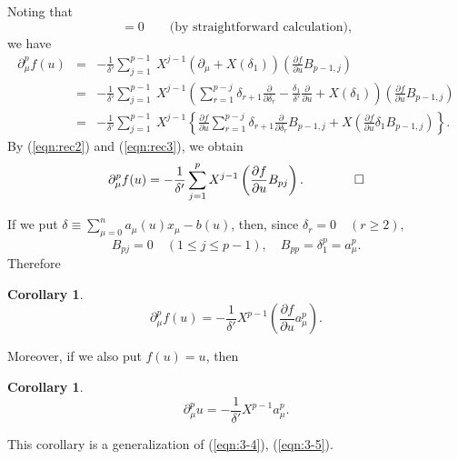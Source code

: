 \documentclass[makeidx,12pt,openany]{report}
\newtheorem{cor}[df]{Corollary}
\begin{document}
Noting that 
\begin{equation}
 [\partial_{\mu}+X(\delta_1), X]=0
 \qquad \mbox{(by straightforward calculation),}
\end{equation}
we have
\begin{eqnarray*}
 \partial_{\mu}^p f(u) 
  &=& -\frac{1}{\delta'} \sum_{j=1}^{p-1} \ 
       X^{j-1} (\partial_{\mu}+X(\delta_1)) 
        \left( \frac{\partial f}{\partial u}B_{p-1,j} \right) \\
  &=& -\frac{1}{\delta'} \sum_{j=1}^{p-1} \ X^{j-1} 
      \left(
       \sum_{r=1}^{p-j} \delta_{r+1} 
        \frac{\partial}{\partial \delta_r} 
       -\frac{\delta_1}{\delta'} \frac{\partial}{\partial u}
        +X(\delta_1) 
      \right) \left( \frac{\partial f}{\partial u}B_{p-1,j} \right) \\
  &=& -\frac{1}{\delta'} \sum_{j=1}^{p-1} \ X^{j-1} 
      \left\{ \frac{\partial f}{\partial u}
       \sum_{r=1}^{p-j} \delta_{r+1} 
        \frac{\partial}{\partial \delta_r} B_{p-1,j} 
        +X \left( \frac{\partial f}{\partial u}\delta_1B_{p-1,j} \right)
      \right\} . 
\end{eqnarray*}
By (\ref{eqn:rec2}) and (\ref{eqn:rec3}), we obtain 
\begin{equation}
 \partial_{\mu}^p f(u) =
    -\frac{1}{\delta'} \sum_{j=1}^p X^{j-1}
     \left( \frac{\partial f}{\partial u}B_{pj} \right) . \qquad \qed
\end{equation}

If we put $\delta \equiv \sum_{\mu =0}^n a_{\mu}(u)x_{\mu}-b(u)$, then, 
since $\delta_r=0 \quad (r \geq 2), $
\begin{equation}
 B_{pj}=0 \quad (1 \le j \le p-1), \quad 
 B_{pp}=\delta_1^p=a_{\mu}^p. 
\end{equation}
Therefore \begin{cor}
\begin{equation}
 \partial_{\mu}^p f(u) =
  -\frac{1}{\delta'} X^{p-1}
   \left( \frac{\partial f}{\partial u}a_{\mu}^p \right).
\end{equation}
\end{cor}
Moreover, if we also put $f(u)=u$, then
\begin{cor}
\begin{equation}
 \partial_{\mu}^p u =
  -\frac{1}{\delta'} X^{p-1}a_{\mu}^p.
\end{equation}
\end{cor}
This corollary is a generalization of (\ref{eqn:3-4}), (\ref{eqn:3-5}).
\end{document}
